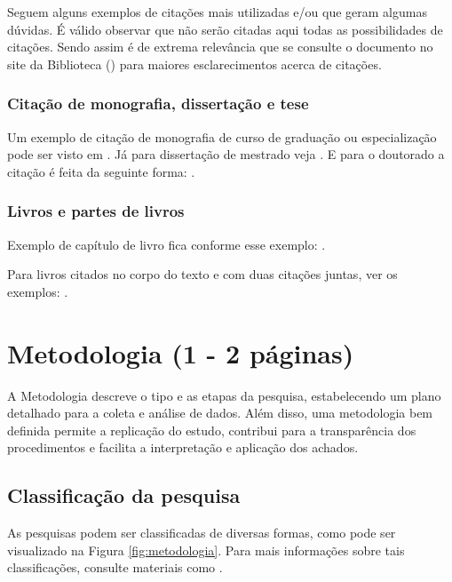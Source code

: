 Seguem alguns exemplos de citações mais utilizadas e/ou que geram algumas dúvidas. É válido observar que não serão citadas aqui
todas as possibilidades de citações. Sendo assim é de extrema relevância que se consulte o documento no site da Biblioteca () para maiores esclarecimentos acerca de citações.

\estrutura\subsubsection{\esp Citação de monografia, dissertação e tese}\instrucao

Um exemplo de citação de monografia de curso de graduação ou especialização pode ser visto em .
Já para dissertação de mestrado veja . E para o doutorado a citação é feita da seguinte forma: . 



\estrutura\subsubsection{\esp Livros e partes de livros}\instrucao

Exemplo de capítulo de livro fica conforme esse exemplo: .

Para livros citados no corpo do texto e com duas citações juntas, ver os exemplos: .

\fi

\iffalse
\newpage

\estrutura\section{\esp Metodologia (1 - 2 páginas)}\instrucao
A Metodologia descreve o tipo e as etapas da pesquisa, estabelecendo um plano detalhado para a coleta e análise de dados. Além disso, uma metodologia bem definida permite a replicação do estudo, contribui para a transparência dos procedimentos e facilita a interpretação e aplicação dos achados.

    \subsection{\esp Classificação da pesquisa}
As pesquisas podem ser classificadas de diversas formas, como pode ser visualizado na Figura \ref{fig:metodologia}. Para mais informações sobre tais classificações, consulte materiais como .

